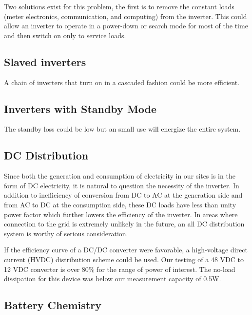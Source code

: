 \documentclass[conference]{IEEEtran}
\begin{document}
Two solutions exist for this problem, the first is to remove
the constant loads (meter electronics, communication, and
computing) from the inverter.
This could allow an inverter to operate in a power-down or
search mode for most of the time and then switch on only
to service loads.

\subsection{Slaved inverters}
A chain of inverters that turn on in a cascaded fashion could
be more efficient.

\subsection{Inverters with Standby Mode}
The standby loss could be low but an small use will energize the
entire system.

\subsection{DC Distribution}

Since both the generation and consumption of electricity in our
sites is in the form of DC electricity, it is natural to
question the necessity of the inverter.
In addition to inefficiency of conversion from DC to AC at the
generation side and from AC to DC at the consumption side,
these DC loads have less than unity power factor which further
lowers the efficiency of the inverter.
In areas where connection to the grid is extremely unlikely
in the future, an all DC distribution system is worthy of
serious consideration.

If the efficiency curve of a DC/DC converter were favorable,
a high-voltage direct current (HVDC) distribution scheme could
be used.
Our testing of a 48 VDC to 12 VDC converter is over 80\% for
the range of power of interest.
The no-load dissipation for this device was below our measurement
capacity of 0.5W.


\subsection{Battery Chemistry}



% 
\end{document}
